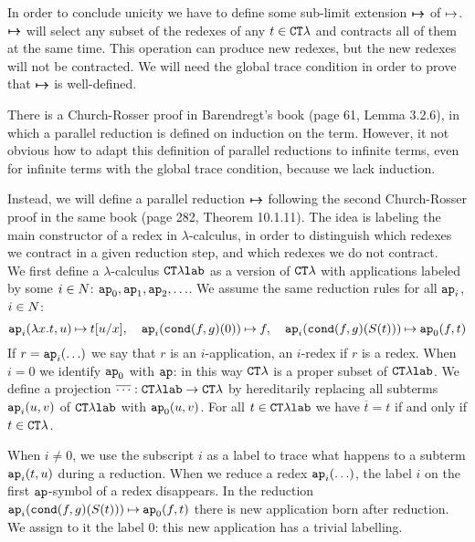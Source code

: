 In order to conclude unicity we have to define some sub-limit extension ${ \mapsto \mspace{-17mu} \mapsto }$ of $\mathbin{\mapsto}$.
${ \mapsto \mspace{-17mu} \mapsto }$ will select any subset of the redexes of any $t \in { {\tt CT}\lambda}$ 
and contracts all of them at the same time. This operation can produce new redexes, but the
new redexes will not be contracted. 
We will need the global trace condition in order to prove that ${ \mapsto \mspace{-17mu} \mapsto }$ is well-defined.


There is a Church-Rosser proof in Barendregt's book (page 61, Lemma 3.2.6),
in which a parallel reduction is defined on induction on the term. 
However, it not obvious how to adapt this definition of parallel reductions to infinite terms,
even for infinite terms with the global trace condition, because we lack induction.

Instead, we will define a parallel reduction ${ \mapsto \mspace{-17mu} \mapsto }$ following the second
Church-Rosser proof in the same book (page 282, Theorem 10.1.11).
The idea is labeling the main constructor of a redex in $\lambda$-calculus,
in order to distinguish which redexes we contract in a given reduction step, and which 
redexes we do not contract.
\\



We first define a $\lambda$-calculus ${{ {\tt CT}\lambda}\mbox{\tt lab}}$ as a version of ${ {\tt CT}\lambda}$ 
with applications labeled by some $i \in {N}$:
${\tt ap}_0, {\tt ap}_1, {\tt ap}_2, \ldots$. We assume the same reduction rules for all ${\tt ap}_i$, $i \in {N}$:
$$
\ap_i(\lambda x.t,u) \reduces t[u/x], \ \ \ 
\ap_i(\cond(f,g)(0)) \reduces f, \ \ \ 
\ap_i(\cond(f,g)(S(t))) \reduces \ap_0(f,t)
$$
If $r = {\tt ap}_i(\ldots)$ we say that $r$ is an $i$-application, an $i$-redex if $r$ is a redex.
When $i=0$ we identify ${\tt ap}_0$ with ${\tt ap}$: in this way ${ {\tt CT}\lambda}$  is a proper
subset of ${{ {\tt CT}\lambda}\mbox{\tt lab}}$.
We define a projection $\overline{\cdots} : {{ {\tt CT}\lambda}\mbox{\tt lab}} \rightarrow { {\tt CT}\lambda}$
by hereditarily replacing all subterms ${\tt ap}_i(u,v)$ of ${{ {\tt CT}\lambda}\mbox{\tt lab}}$ with 
 ${\tt ap}_0(u,v)$. For all $t \in { { {\tt CT}\lambda} \mbox{\tt lab}}$ we have  $\overline{t} = t$
if and only if $t \in { {\tt CT}\lambda}$.

When $i \not = 0$, we use the subscript $i$ as a label to trace what
happens to a subterm ${\tt ap}_i(t,u)$ during a reduction. When we reduce a redex ${\tt ap}_i(\ldots)$,
the label $i$ on the first ${\tt ap}$-symbol of a redex disappears. 
In the reduction ${\tt ap}_i({\tt cond}(f,g)(S(t))) \mathbin{\mapsto} {\tt ap}_0(f,t)$ there is new application born after reduction. 
We assign to it the label $0$: this new application has a trivial labelling.

